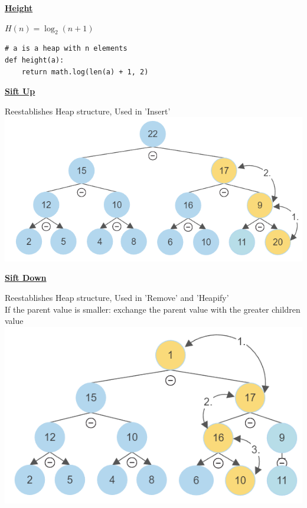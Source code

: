     {\centering\underline{\textbf{Height}} \par}
        $H(n) = \log_2(n+1)$
        \begin{lstlisting}
# a is a heap with n elements
def height(a):
    return math.log(len(a) + 1, 2)
        \end{lstlisting}

    {\centering\underline{\textbf{Sift Up}} \par}
        Reestablishes Heap structure, Used in 'Insert'
        \includegraphics[width = \linewidth]{src/5_data_structure/images/heap_sift_up.png}
        

    {\centering\underline{\textbf{Sift Down}} \par}
        Reestablishes Heap structure, Used in 'Remove' and 'Heapify'\\
        If the parent value is smaller: exchange the parent value with the greater children value
        \includegraphics[width = \linewidth]{src/5_data_structure/images/heap_sift_down.png}
        

